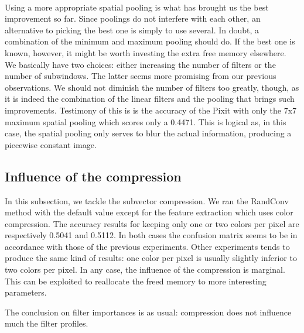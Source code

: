 \documentclass[a4paper]{report}
\begin{document}
	
	\paragraph{}
	Using a more appropriate spatial pooling is what has brought us the best improvement so far. Since poolings do not interfere with each other, an alternative to picking the best one is simply to use several. In doubt, a combination of the minimum and maximum pooling should do. If the best one is known, however, it might be worth investing the extra free memory elsewhere. We basically have two choices: either increasing the number of filters or the number of subwindows. The latter seems more promising from our previous observations. We should not diminish the number of filters too greatly, though, as it is indeed the combination of the linear filters and the pooling that brings such improvements. Testimony of this is is the accuracy of the Pixit with only the 7x7 maximum spatial pooling which scores only a 0.4471. This is logical as, in this case, the spatial pooling only serves to blur the actual information, producing a piecewise constant image.
	
	
	
	\subsection{Influence of the compression}
	In this subsection, we tackle the subvector compression. We ran the RandConv method with the default value except for the feature extraction which uses color compression. The accuracy results for keeping only one or two colors per pixel are respectively 0.5041 and 0.5112. In both cases the confusion matrix seems to be in accordance with those of the previous experiments. Other experiments tends to produce the same kind of results: one color per pixel is usually slightly inferior to two colors per pixel. In any case, the influence of the compression is marginal. This can be exploited to reallocate the freed memory to more interesting parameters.
	\par
	The conclusion on filter importances is as usual: compression does not influence much the filter profiles.
	
\end{document}
